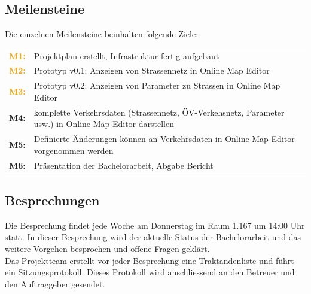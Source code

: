 \documentclass[10pt,a4paper]{article}
\begin{document}
\subsection{Meilensteine}
\begin{flushleft}
Die einzelnen Meilensteine beinhalten folgende Ziele:
\end{flushleft}
\begin{tabular}{cl}
	\textcolor{Orange}{\textbf{M1:}} & Projektplan erstellt, Infrastruktur fertig aufgebaut \\[0.2cm]
	\textcolor{Orange}{\textbf{M2:}} & Prototyp v0.1: Anzeigen von Strassennetz in Online Map Editor \\[0.2cm]
	\textcolor{Orange}{\textbf{M3:}} & Prototyp v0.2: Anzeigen von Parameter zu Strassen in Online Map Editor \\[0.2cm]
	\textcolor{NavyBlue}{\textbf{M4:}} & komplette Verkehrsdaten (Strassennetz, ÖV-Verkehsnetz, Parameter usw.) in Online Map-Editor darstellen\\[0.2cm]
	\textcolor{NavyBlue}{\textbf{M5:}} & Definierte Änderungen können an Verkehrsdaten in Online Map-Editor vorgenommen werden\\[0.2cm]
	\textcolor{Dandelion}{\textbf{M6:}} & Präsentation der Bachelorarbeit, Abgabe Bericht\\
\end{tabular}
\subsection{Besprechungen}
\begin{flushleft}
	Die Besprechung findet jede Woche am Donnerstag im Raum 1.167 um 14:00 Uhr statt. In dieser Besprechung wird der aktuelle Status der Bachelorarbeit und das weitere Vorgehen besprochen und offene Fragen geklärt.\\
Das Projektteam erstellt vor jeder Besprechung eine Traktandenliste und führt ein Sitzungsprotokoll. Dieses Protokoll wird anschliessend an den Betreuer und den Auftraggeber gesendet.
\end{flushleft}

\newpage

\end{document}
